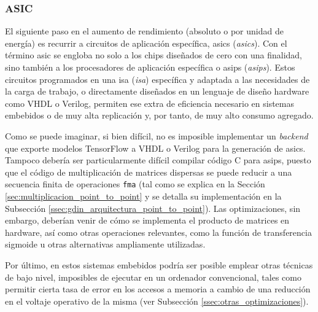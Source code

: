 \subsubsection{ASIC}
\label{sssec:heterogeneas_asic}
El siguiente paso en el aumento de rendimiento (absoluto o por unidad de energía) es recurrir a circuitos de aplicación específica, \acrshort{asic}s (\textit{\acrlong{asic}s}). Con el término \acrshort{asic} se engloba no solo a los chips diseñados de cero con una finalidad, sino también a los procesadores de aplicación específica o \acrshort{asip}s (\textit{\acrlong{asip}s}). Estos circuitos programados en una \acrshort{isa} (\textit{\acrlong{isa}}) específica y adaptada a las necesidades de la carga de trabajo, o directamente diseñados en un lenguaje de diseño hardware como VHDL o Verilog, permiten ese extra de eficiencia necesario en sistemas embebidos o de muy alta replicación y, por tanto, de muy alto consumo agregado.

Como se puede imaginar, si bien difícil, no es imposible implementar un \textit{backend} que exporte modelos TensorFlow a VHDL o Verilog para la generación de \acrshort{asic}s. Tampoco debería ser particularmente difícil compilar código C para \acrshort{asip}s, puesto que el código de multiplicación de matrices dispersas se puede reducir a una secuencia finita de operaciones \texttt{\acrshort{fma}} (tal como se explica en la Sección \ref{sec:multiplicacion_point_to_point} y se detalla su implementación en la Subsección \ref{ssec:gdin_arquitectura_point_to_point}). Las optimizaciones, sin embargo, deberían venir de cómo se implementa el producto de matrices en hardware, así como otras operaciones relevantes, como la función de transferencia sigmoide u otras alternativas ampliamente utilizadas.

Por último, en estos sistemas embebidos podría ser posible emplear otras técnicas de bajo nivel, imposibles de ejecutar en un ordenador convencional, tales como permitir cierta tasa de error en los accesos a memoria a cambio de una reducción en el voltaje operativo de la misma (ver Subsección \ref{ssec:otras_optimizaciones}).